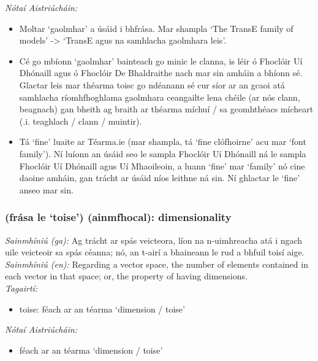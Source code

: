  \noindent \textit{Nótaí Aistriúcháin:}
\begin{itemize}
	\item Moltar `gaolmhar' a úsáid i bhfrása. Mar shampla `The TransE family of models' -> `TransE agus na samhlacha gaolmhara leis'.
	\item Cé go mbíonn `gaolmhar' bainteach go minic le clanna, is léir ó Fhoclóir Uí Dhónaill agus ó Fhoclóir De Bhaldraithe nach mar sin amháin a bhíonn sé. Glactar leis mar théarma toisc go ndéanann sé cur síor ar an gcaoi atá samhlacha ríomhfhoghlama gaolmhara ceangailte lena chéile (ar nós clann, beagnach) gan bheith ag braith ar théarma míchuí / sa gcomhthéacs mícheart (.i. teaghlach / clann / muintir).
	\item Tá `fine' luaite ar Téarma.ie (mar shampla, tá `fine clófhoirne' acu mar `font family'). Ní luíonn an úsáid seo le sampla Fhoclóir Uí Dhónaill ná le sampla Fhoclóir Uí Dhónaill agus Uí Mhaoileoin, a luann `fine' mar `family' nó cine daoine amháin, gan trácht ar úsáid níos leithne ná sin. Ní ghlactar le `fine' anseo mar sin.
\end{itemize}


\subsubsection*{(frása le `toise') (ainmfhocal): dimensionality}
 \noindent \textit{Sainmhíniú (ga):} Ag trácht ar spás veicteora, líon na n-uimhreacha atá i ngach uile veicteoir sa spás céanna; nó, an t-airí a bhaineann le rud a bhfuil toisí aige.
\\
 \noindent \textit{Sainmhíniú (en):} Regarding a vector space, the number of elements contained in each vector in that space; or, the property of having dimensions.
\\
 \noindent \textit{Tagairtí:}
\begin{itemize}
	\item toise: féach ar an téarma `dimension / toise'
\end{itemize}

 \noindent \textit{Nótaí Aistriúcháin:}
\begin{itemize}
	\item féach ar an téarma `dimension / toise'
\end{itemize}


